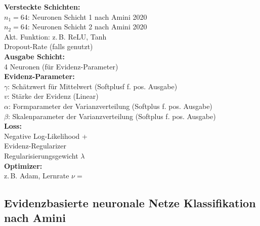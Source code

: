 \begin{center}
\begin{minipage}[t]{0.48\textwidth}
\textbf{Versteckte Schichten:} \\
$n_1 = 64$: Neuronen Schicht 1 nach Amini 2020 \\
$n_2 = 64$: Neuronen Schicht 2 nach Amini 2020 \\
Akt. Funktion: z.\,B. ReLU, Tanh \\
Dropout-Rate (falls genutzt) \\[4pt]

\textbf{Ausgabe Schicht:} \\
4 Neuronen (für Evidenz-Parameter) \\[4pt]

\textbf{Evidenz-Parameter:} \\
$\gamma$: Schätzwert für Mittelwert (Softplusf f. pos. Ausgabe) \\
$v$: Stärke der Evidenz (Linear)\\
$\alpha$: Formparameter der Varianzverteilung (Softplus f. pos. Ausgabe)\\
$\beta$: Skalenparameter der Varianzverteilung (Softplus f. pos. Ausgabe)\\[4pt]

\textbf{Loss:} \\
Negative Log-Likelihood + \\
Evidenz-Regularizer \\
Regularisierungsgewicht $\lambda$ \\[4pt]

\textbf{Optimizer:} \\
z.\,B. Adam, Lernrate $\nu = $ 
\end{minipage}
\end{center}

\newpage



\subsection*{\gls{Evidenzbasierte neuronale Netze} Klassifikation nach Amini \parencite{amini2020deep}}

\par\vspace{1\baselineskip}\noindent

